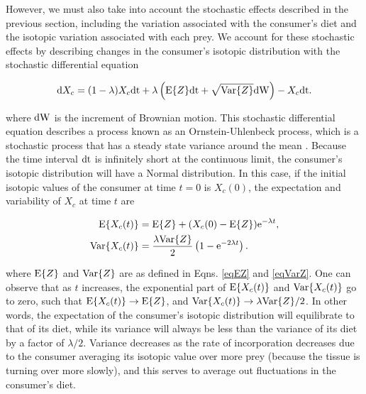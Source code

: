 \documentclass{frontiersSCNS}
\begin{document}
However, we must also take into account the stochastic effects described in the previous section, including the variation associated with the consumer's diet and the isotopic variation associated with each prey.
We account for these stochastic effects by describing changes in the consumer's isotopic distribution with the stochastic differential equation

\begin{equation}
\label{eqSDE}
{\rm d}X_c = (1-\lambda)X_c{\rm dt} + \lambda\left({\rm E}\{Z\}{\rm dt} + \sqrt{{\rm Var}\{Z\}}{\rm dW}\right) - X_c{\rm dt}.
\end{equation}

\noindent where ${\rm dW}$ is the increment of Brownian motion.
This stochastic differential equation describes a process known as an Ornstein-Uhlenbeck process, which is a stochastic process that has a steady state variance around the mean \citep{Mangel:2006wa}.
Because the time interval ${\rm dt}$ is infinitely short at the continuous limit, the consumer's isotopic distribution will have a Normal distribution.
In this case, if the initial isotopic values of the consumer at time $t=0$ is $X_c(0)$, the expectation and variability of $X_c$ at time $t$ are

\begin{align}
  \begin{split}
    \label{eqEVar}
{\rm E}\{X_c(t)\} &= {\rm E}\{Z\} + (X_c(0) - {\rm E}\{Z\}){\rm e}^{-\lambda t},\\
{\rm Var}\{X_c(t)\} &= \frac{\lambda {\rm Var}\{Z\}}{2}\left(1 - {\rm e}^{-2\lambda t}\right).
\end{split}
\end{align}

\noindent where ${\rm E}\{Z\}$ and ${\rm Var}\{Z\}$ are as defined in Eqns. \ref{eqEZ} and \ref{eqVarZ}.
One can observe that as $t$ increases, the exponential part of ${\rm E}\{X_c(t)\}$ and ${\rm Var}\{X_c(t)\}$ go to zero, such that ${\rm E}\{X_c(t)\} \to {\rm E}\{Z\}$, and ${\rm Var}\{X_c(t)\} \to \lambda{\rm Var}\{Z\}/2$.
In other words, the expectation of the consumer's isotopic distribution will equilibrate to that of its diet, while its variance will always be less than the variance of its diet by a factor of $\lambda/2$.
Variance decreases as the rate of incorporation decreases due to the consumer averaging its isotopic value over more prey (because the tissue is turning over more slowly), and this serves to average out fluctuations in the consumer's diet.
\end{document}
